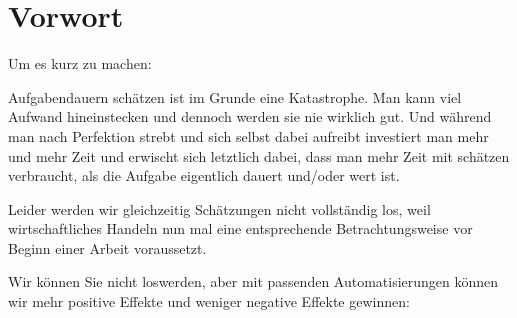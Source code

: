 \hypertarget{foreword}{%
\section{Vorwort}\label{foreword}}

Um es kurz zu machen: 

Aufgabendauern schätzen ist im Grunde eine Katastrophe. 
Man kann viel Aufwand hineinstecken und dennoch werden sie nie wirklich gut. 
Und während man nach Perfektion strebt und sich selbst dabei aufreibt investiert man 
mehr und mehr Zeit und erwischt sich letztlich dabei, dass man mehr Zeit mit schätzen 
verbraucht, als die Aufgabe eigentlich dauert und/oder wert ist.

Leider werden wir gleichzeitig Schätzungen nicht vollständig los, weil wirtschaftliches 
Handeln nun mal eine entsprechende Betrachtungsweise vor Beginn einer Arbeit voraussetzt. 

Wir können Sie nicht loswerden, aber mit passenden Automatisierungen können wir mehr 
positive Effekte und weniger negative Effekte gewinnen:

